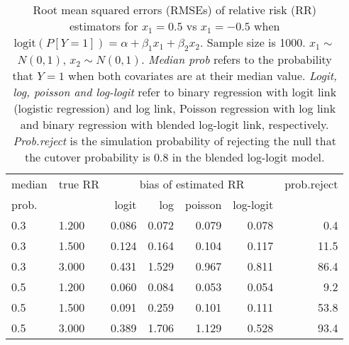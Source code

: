 \documentclass[12pt,a4paper]{article}
\begin{document}
\begin{table}[H] 
\small\sf\centering 
\caption{Root mean squared errors (RMSEs) of relative risk (RR) estimators for $x_1=0.5$ vs $x_1=-0.5$ when $\mbox{logit}(P[Y=1])=\alpha+\beta_1 x_1 + \beta_2 x_2$. Sample size is 1000. $x_1 \sim $$N(0,1)$, $x_2 \sim N(0,1)$. {\it Median prob} refers to the probability that $Y=1$ when both covariates are at their median value. {\it Logit, log, poisson and log-logit} refer to binary regression with logit link (logistic regression) and log link, Poisson regression with log link and binary regression with blended log-logit link, respectively. {\it Prob.reject} is the simulation probability of rejecting the null that the cutover probability is $0.8$ in the blended log-logit model.} 
\begin{tabular}{llrrrrr} 
\toprule 
median & true RR & \multicolumn{4}{c}{bias of estimated RR} & prob.reject \\ 
prob. & & logit & log & poisson & log-logit  & \\ \midrule 
0.3 & 1.200 & 0.086 & 0.072 & 0.079 & 0.078 &  0.4 \\  
0.3 & 1.500 & 0.124 & 0.164 & 0.104 & 0.117 & 11.5 \\  
0.3 & 3.000 & 0.431 & 1.529 & 0.967 & 0.811 & 86.4 \\  
0.5 & 1.200 & 0.060 & 0.084 & 0.053 & 0.054 &  9.2 \\  
0.5 & 1.500 & 0.091 & 0.259 & 0.101 & 0.111 & 53.8 \\  
0.5 & 3.000 & 0.389 & 1.706 & 1.129 & 0.528 & 93.4 \\  
\bottomrule 
\end{tabular} 
\end{table} 
\end{document}
